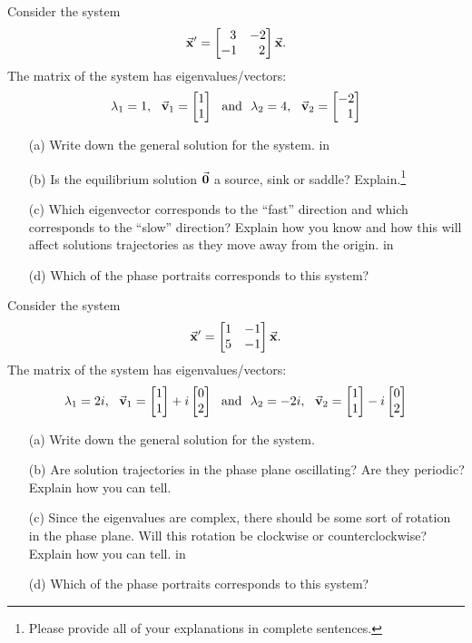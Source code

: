 \documentclass[epsf]{article}
\begin{document}
 Consider the system
$$\vec{\bf x}' = \begin{bmatrix}\ \ 3 & -2 \cr -1 &\ \ 2 \end{bmatrix}\vec{\bf x}.$$
The matrix of the system has eigenvalues/vectors:
$$ \lambda_1 = 1, \ \ \vec{\bf v}_1 = \begin{bmatrix}1\cr 1 \end{bmatrix} \ \ \text{and} \ \ \lambda_2 = 4,\ \ \vec{\bf v}_2= \begin{bmatrix}-2\cr \ \ 1 \end{bmatrix}$$
\begin{itemize}
\item[(a)] Write down the general solution for the system.
  in
\item[(b)] Is the equilibrium solution $\vec{\bf 0}$ a source, sink or saddle? Explain.\footnote{Please provide all of your explanations in complete sentences.}
\newpage

\item[(c)] Which eigenvector corresponds to the ``fast'' direction and which corresponds to the ``slow'' direction?  Explain how you know and how this will affect solutions trajectories as they move away from the origin.
 in
\item[(d)] Which of the phase portraits corresponds to this system?
\end{itemize}

\vskip 1in

 Consider the system
$$\vec{\bf x}' = \begin{bmatrix} 1 & -1 \cr 5 & -1 \end{bmatrix}\vec{\bf x}.$$
The matrix of the system has eigenvalues/vectors:
$$ \lambda_1 = 2i, \ \ \vec{\bf v}_1 = \begin{bmatrix}1\cr 1 \end{bmatrix} + i\begin{bmatrix}0 \cr 2 \end{bmatrix}\ \ \text{and} \ \ \lambda_2 = -2i,\ \ \vec{\bf v}_2= \begin{bmatrix}1\cr 1 \end{bmatrix} - i\begin{bmatrix}0 \cr 2 \end{bmatrix}$$

\begin{itemize}
\item[(a)] Write down the general solution for the system.
\vskip 1in
\item[(b)] Are solution trajectories in the phase plane oscillating?  Are they periodic? Explain how you can tell.
\newpage

\item[(c)] Since the eigenvalues are complex, there should be some sort of rotation in the phase plane.  Will this rotation be clockwise or counterclockwise?  Explain how you can tell.
 in
\item[(d)] Which of the phase portraits corresponds to this system?
\end{itemize}
\end{document}
